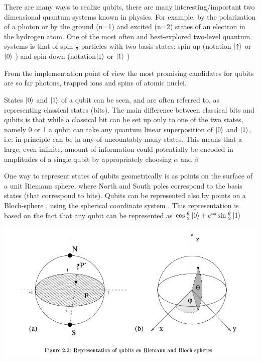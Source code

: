 \documentclass[12pt]{book}
\begin{document}
There are many ways to realize qubits, there are many interesting/important two 
dimensional quantum systems known in physics.  For example,  by the polarization of a
photon or by the ground (n=1) and excited (n=2) states of an electron in the hydrogen
atom. One of the most often and best-explored two-level quantum systems is that of spin-$\frac{1}{2}$ particles with two basis states: spin-up (notation $\ket{\uparrow}$ or $\ket{0}$ ) and spin-down
(notation$\ket{\downarrow}$ or $\ket{1}$ ) 



From the implementation point of view the most promising candidates for qubits are so
far photons, trapped ions and spins of atomic nuclei.

States $\ket{0}$ and $\ket{1}$ of a qubit 
can be seen, and are often referred to, as representing
classical states (bits).
The main difference between classical bits and qubits is that 
while a classical bit can be set up only to one of the two 
states, namely 0 or 1 a qubit can take any
quantum linear superposition of $\ket{0}$ and $\ket{1}$,
i.e: in principle can be in any of uncountably
many states. This means that a large, even infinite, amount of information could potentially
be encoded in amplitudes of a single qubit by appropriately choosing $\alpha$ and  $\beta$

One way to represent states of qubits geometrically is as points on the surface of a
unit Riemann sphere, where North and South poles correspond to the basis states (that correspond to bits).
Qubits can be represented also by points on a Bloch-sphere , using the
spherical coordinate system .
This representation is based on the fact that any qubit can be
represented as $\cos{\frac{\theta}{2}}\ket{0} + e^{i\phi}\sin{\frac{\theta}{2}}\ket{1}$



\begin{center}
	\includegraphics[scale=.6]{./sphere1.png}
\end{center}
\end{document}
